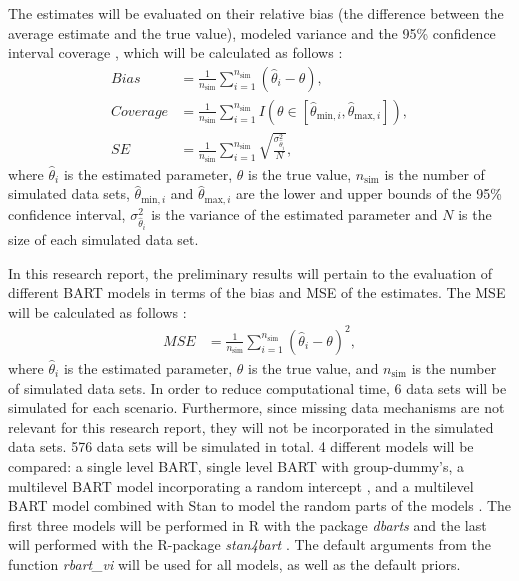 \documentclass[10pt, a4paper, titlepage]{article}
\begin{document}
The estimates will be evaluated on their relative bias (the difference between the average estimate and the true value), modeled variance and the 95\% confidence interval coverage \citep{oberman2023}, which will be calculated as follows \citep{morris2019}:
\begin{subequations}
\label{eq:evaluations}
\begin{align}
Bias &= \frac{1}{n_{\text{sim}}} \sum_{i=1}^{n_{\text{sim}}} (\hat{\theta}_i - \theta), \tag{5} \\
Coverage &= \frac{1}{n_{\text{sim}}} \sum_{i=1}^{n_{\text{sim}}} I({\theta} \in [\hat{\theta}_{\text{min},i}, \hat{\theta}_{\text{max},i}]), \tag{6} \\
SE &= \frac{1}{n_{\text{sim}}} \sum_{i=1}^{n_{\text{sim}}} \sqrt{\frac{\sigma^2_{\hat{\theta}_i}}{N}}, \tag{7}
\end{align}
\end{subequations}
where $\hat{\theta}_i$ is the estimated parameter, $\theta$ is the true value, $n_{\text{sim}}$ is the number of simulated data sets, $\hat{\theta}_{\text{min},i}$ and $\hat{\theta}_{\text{max},i}$ are the lower and upper bounds of the 95\% confidence interval, $\sigma^2_{\hat{\theta}_i}$ is the variance of the estimated parameter and $N$ is the size of each simulated data set.

In this research report, the preliminary results will pertain to the evaluation of different BART models in terms of the bias and MSE of the estimates. The MSE will be calculated as follows \citep{morris2019}:
\begin{subequations}
\label{eq:MSE}
\begin{align}
MSE &= \frac{1}{n_{\text{sim}}} \sum_{i=1}^{n_{\text{sim}}} (\hat{\theta}_i - \theta)^{2}, \tag{8}
\end{align}
\end{subequations}
where $\hat{\theta}_i$ is the estimated parameter, $\theta$ is the true value, and $n_{\text{sim}}$ is the number of simulated data sets. In order to reduce computational time, 6 data sets will be simulated for each scenario. Furthermore, since missing data mechanisms are not relevant for this research report, they will not be incorporated in the simulated data sets. 576 data sets will be simulated in total.
4 different models will be compared: a single level BART, single level BART with group-dummy's, a multilevel BART model incorporating a random intercept \citep{chen2020, wagner2020, tan2016, wundervald2022}, and a multilevel BART model combined with Stan to model the random parts of the models \citep{dorie2022}. The first three models will be performed in R \citep{rcoreteam2023} with the package \textit{dbarts} \citep{dorie2023} and the last will performed with the R-package \textit{stan4bart} \citep{dorie2023a}. The default arguments from the function \textit{rbart\_vi} will be used for all models, as well as the default priors.
\end{document}
